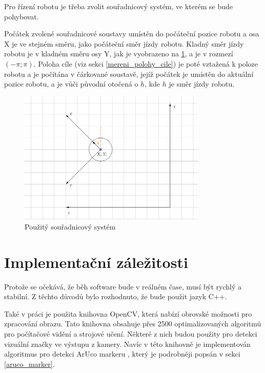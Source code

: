\documentclass[twoside]{ctuthesis}
\theoremstyle{plain}
\theoremstyle{definition}
\theoremstyle{note}
\begin{document}
Pro řízení robotu je třeba zvolit souřadnicový systém, ve kterém se bude pohybovat.

Počátek zvolené souřadnicové soustavy umístěn do počáteční pozice robotu a osa X je ve stejném směru, jako počáteční směr jízdy robotu. Kladný směr jízdy robotu je v kladném směru osy Y, jak je vyobrazeno na \ref{ss}, a je v rozmezí $\left(-\pi; \pi\right)$. Poloha cíle (viz sekci \ref{mereni_polohy_cile}) je poté vztažená k poloze robotu a je počítána v čárkované soustavě, jejíž počátek je umístěn do aktuální pozice robotu, a je vůči původní otočená o $h$, kde $h$ je směr jízdy robotu.


\begin{figure}[]
	\caption{Použitý souřadnicový systém}
	
	\label{ss}
	\includegraphics[width=0.8\textwidth]{images/2/ss.png}
\end{figure}
\section{Implementační záležitosti}


Protože se očekává, že běh software bude v reálném čase, musí být rychlý a stabilní. Z těchto důvodů bylo rozhodnuto, že bude použit jazyk C++.

Také v práci je použita knihovna OpenCV\cite{cite:4}, která nabízí obrovské možnosti pro zpracování obrazu. Tato knihovna obsahuje přes 2500 optimalizovaných algoritmů pro počítačové vidění a strojové učení. Některé z nich budou použity pro detekci vizuální značky ve výstupu z kamery. Navíc v této knihovně je implementován algoritmus pro detekci ArUco markeru \cite{cite:1}, který je podrobněji popsán v sekci \ref{aruco_marker}.
\end{document}

